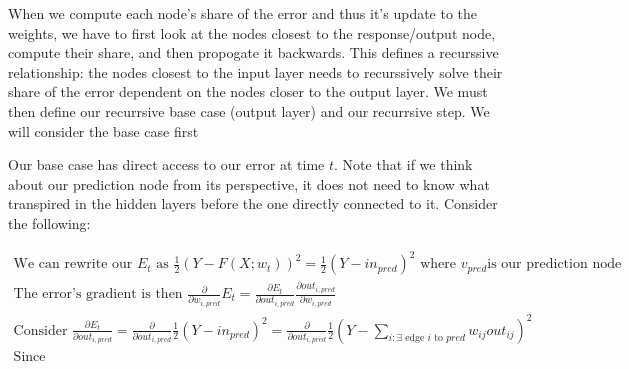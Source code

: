\documentclass[11pt]{article}
\begin{document}
\vspace{5 mm}
\noindent
When we compute each node's share of the error and thus it's update to the 
weights, we have to first look at the nodes closest to the response/output 
node, compute their share, and then propogate it backwards. This defines a 
recurssive relationship: the nodes closest to the input layer needs to 
recurssively solve their share of the error dependent on the nodes closer to 
the output layer. We must then define our recurrsive base case (output layer) 
and our recurrsive step. We will consider the base case first

\vspace{5 mm}
\noindent
Our base case has direct access to our error at time $t$. Note that if we think 
about our prediction node from its perspective, it does not need to know what 
transpired in the hidden layers before the one directly connected to it. 
Consider the following:

\begin{gather*}
\text{We can rewrite our } E_{t} \text{ as } 
\frac{1}{2}(Y - F(X; w_{t}))^{2} = 
\frac{1}{2}(Y - in_{pred})^{2} 
\text{ where } v_{pred} \text{is our prediction node}\\
\text{The error's gradient is then } 
\frac{\partial}{\partial w_{i,pred}} E_{t} = 
\frac{\partial E_{t}}{\partial out_{i, pred}} 
\frac{\partial out_{i, pred}}{\partial w_{i,pred}}\\
\text{Consider } \frac{\partial E_{t}}{\partial out_{i, pred}} = 
\frac{\partial}{\partial out_{i, pred}} \frac{1}{2}(Y - in_{pred})^{2} = 
\frac{\partial}{\partial out_{i, pred}} 
\frac{1}{2}(Y - \sum_{i: \exists \text{ edge } i \text{ to } pred} w_{ij} 
out_{ij})^{2}\\
\text{Since }
\end{gather*}
\end{document}
